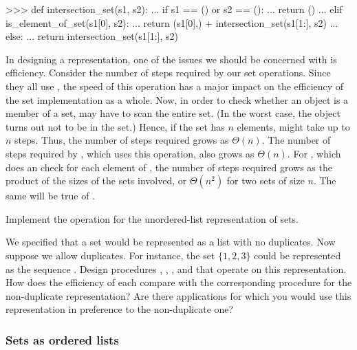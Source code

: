 \begin{codeBlock}
>>> def intersection_set(s1, s2):
...     if s1 == () or s2 == ():
...         return ()
...     elif is_element_of_set(s1[0], s2):
...         return (s1[0],) + intersection_set(s1[1:], s2)
...     else:
...         return intersection_set(s1[1:], s2)
\end{codeBlock}

\noindent
In designing a representation, one of the issues we should be concerned with is
efficiency.  Consider the number of steps required by our set operations. Since
they all use , the speed of this operation has a
major impact on the efficiency of the set implementation as a whole.  Now, in
order to check whether an object is a member of a set,
 may have to scan the entire set. (In the worst
case, the object turns out not to be in the set.)  Hence, if the set has \( n
\) elements,   might take up to \( n \) steps.
Thus, the number of steps required grows as \( \Theta(n) \).  The number of
steps required by , which uses this operation, also grows as
\( \Theta(n) \). For , which does an
 check for each element of , the number
of steps required grows as the product of the sizes of the sets involved, or \(
\Theta(n^2) \) for two sets of size \( n \).  The same will be true of
.

\begin{exerciseGroup}
\label{Exercise 2.59}
 Implement the 
operation for the unordered-list representation of sets.

\label{Exercise 2.60}
 We specified that a set would be
represented as a list with no duplicates.  Now suppose we allow duplicates. For
instance, the set \( \{1, 2, 3\} \) could be represented as the sequence
.  Design procedures ,
, , and  that
operate on this representation.  How does the efficiency of each compare with
the corresponding procedure for the non-duplicate representation?  Are there
applications for which you would use this representation in preference to the
non-duplicate one?
\end{exerciseGroup}

\subsubsection*{Sets as ordered lists}

